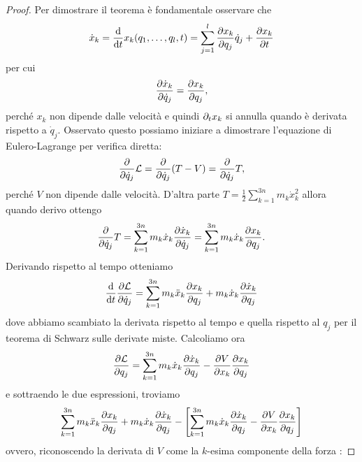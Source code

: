     \begin{proof}
    Per dimostrare il teorema è fondamentale osservare che
    \begin{equation}
        \dot{x}_k = \frac{\mathrm{d}}{\mathrm{d}t} x_k(q_1,\dots,q_l, t) = \sum_{j=1}^l \frac{\partial x_k}{\partial q_j}\dot{q}_j + \frac{\partial x_k}{\partial t}
    \end{equation}
    per cui
    \begin{equation}
        \frac{\partial \dot{x}_k}{\partial \dot{q}_j} = \frac{\partial x_k}{\partial q_j},
    \end{equation}
    perché $x_k$ non dipende dalle velocità e quindi $\partial_t x_k$ si annulla quando è derivata rispetto a $\dot{q}_j$. Osservato questo possiamo iniziare a dimostrare l'equazione di Eulero-Lagrange per verifica diretta:
    \begin{equation}
        \frac{\partial}{\partial \dot{q}_j} \mathcal{L} = \frac{\partial}{\partial \dot{q}_j} (T-V) = \frac{\partial}{\partial \dot{q}_j}T,
    \end{equation}
    perché $V$ non dipende dalle velocità. D'altra parte $T = \frac{1}{2}\sum_{k=1}^{3n}m_k\dot{x}_k^2$ allora quando derivo ottengo 
    \begin{equation}
        \frac{\partial}{\partial \dot{q}_j}T = \sum_{k=1}^{3n} m_k \dot{x}_k \frac{\partial \dot{x}_k}{\partial \dot{q}_j} = \sum_{k=1}^{3n} m_k \dot{x}_k \frac{\partial x_k}{\partial q_j}.
    \end{equation}
    Derivando rispetto al tempo otteniamo
    \begin{equation}
        \frac{\mathrm{d}}{\mathrm{d}t} \frac{\partial \mathcal{L}}{\partial \dot{q}_j} = \sum_{k=1}^{3n} m_k \ddot{x}_k \frac{\partial x_k}{\partial q_j} + m_k \dot{x}_k \frac{\partial \dot{x}_k}{\partial q_j}
    \end{equation}
    dove abbiamo scambiato la derivata rispetto al tempo e quella rispetto al $q_j$ per il teorema di Schwarz sulle derivate miste. Calcoliamo ora
    \begin{equation}
        \frac{\partial \mathcal{L}}{\partial q_j} = \sum_{k=1}^{3n}m_k\dot{x}_k \frac{\partial \dot{x}_k}{\partial q_j} - \frac{\partial V}{\partial x_k}\frac{\partial x_k}{\partial q_j}
    \end{equation} 
    e sottraendo le due espressioni, troviamo 
    \begin{equation}
        \sum_{k=1}^{3n} m_k \ddot{x}_k \frac{\partial x_k}{\partial q_j} + m_k \dot{x}_k \frac{\partial \dot{x}_k}{\partial q_j} -\left[\sum_{k=1}^{3n}m_k\dot{x}_k \frac{\partial \dot{x}_k}{\partial q_j} - \frac{\partial V}{\partial x_k}\frac{\partial x_k}{\partial q_j}\right] 
    \end{equation}
    ovvero, riconoscendo la derivata di $V$ come la $k$-esima componente della forza :

\end{proof}
